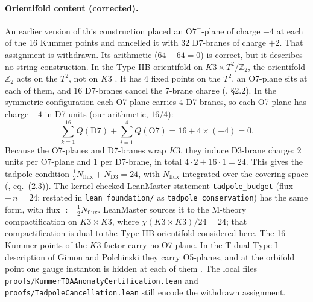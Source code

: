 \documentclass[11pt,a4paper]{article}
\begin{document}
\paragraph{Orientifold content (corrected).} An earlier version of this construction placed an O$7^-$-plane of charge $-4$ at each of the 16 Kummer points and cancelled it with 32 D7-branes of charge $+2$. That assignment is withdrawn. Its arithmetic ($64-64=0$) is correct, but it describes no string construction. In the Type IIB orientifold on $K3\times T^2/\mathbb{Z}_2$, the orientifold $\mathbb{Z}_2$ acts on the $T^2$, not on $K3$ \cite{tripathy2003}. It has 4 fixed points on the $T^2$, an O7-plane sits at each of them, and 16 D7-branes cancel the 7-brane charge (\cite{tripathy2003}, \S2.2). In the symmetric configuration each O7-plane carries 4 D7-branes, so each O7-plane has charge $-4$ in D7 units (our arithmetic, $16/4$):
\begin{equation}
\sum_{k=1}^{16} Q(\text{D}7) + \sum_{i=1}^{4} Q(\text{O}7) = 16 + 4\times(-4) = 0 .
\end{equation}
Because the O7-planes and D7-branes wrap $K3$, they induce D3-brane charge: 2 units per O7-plane and 1 per D7-brane, in total $4\cdot 2 + 16\cdot 1 = 24$. This gives the tadpole condition $\tfrac12 N_{\text{flux}} + N_{\text{D3}} = 24$, with $N_{\text{flux}}$ integrated over the covering space (\cite{tripathy2003}, eq.~(2.3)). The kernel-checked LeanMaster statement \texttt{tadpole\_budget} (flux $+\,n = 24$; restated in \texttt{lean\_foundation/} as \texttt{tadpole\_conservation}) has the same form, with flux $:= \tfrac12 N_{\text{flux}}$. LeanMaster sources it to the M-theory compactification on $K3\times K3$, where $\chi(K3\times K3)/24 = 24$; that compactification is dual to the Type IIB orientifold considered here. The 16 Kummer points of the $K3$ factor carry no O7-plane. In the T-dual Type I description of Gimon and Polchinski \cite{gimon1996} they carry O5-planes, and at the orbifold point one gauge instanton is hidden at each of them \cite{berkooz1996}. The local files \texttt{proofs/KummerTDAAnomalyCertification.lean} and \texttt{proofs/TadpoleCancellation.lean} still encode the withdrawn assignment.
\end{document}
